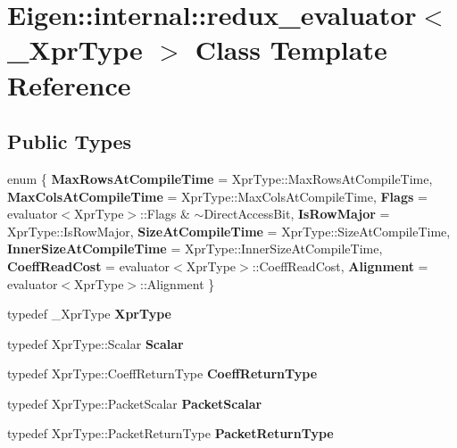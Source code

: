 \hypertarget{class_eigen_1_1internal_1_1redux__evaluator}{}\section{Eigen\+::internal\+::redux\+\_\+evaluator$<$ \+\_\+\+Xpr\+Type $>$ Class Template Reference}
\label{class_eigen_1_1internal_1_1redux__evaluator}
\subsection*{Public Types}
\begin{DoxyCompactItemize}
\item 
\mbox{\label{class_eigen_1_1internal_1_1redux__evaluator_aaf5162129fc671c417a2a0e9fa6ec01c}} 
enum \{ \newline
{\bfseries Max\+Rows\+At\+Compile\+Time} = Xpr\+Type\+::Max\+Rows\+At\+Compile\+Time, 
{\bfseries Max\+Cols\+At\+Compile\+Time} = Xpr\+Type\+::Max\+Cols\+At\+Compile\+Time, 
{\bfseries Flags} = evaluator$<$Xpr\+Type$>$\+::Flags \& $\sim$\+Direct\+Access\+Bit, 
{\bfseries Is\+Row\+Major} = Xpr\+Type\+::Is\+Row\+Major, 
\newline
{\bfseries Size\+At\+Compile\+Time} = Xpr\+Type\+::Size\+At\+Compile\+Time, 
{\bfseries Inner\+Size\+At\+Compile\+Time} = Xpr\+Type\+::Inner\+Size\+At\+Compile\+Time, 
{\bfseries Coeff\+Read\+Cost} = evaluator$<$Xpr\+Type$>$\+::Coeff\+Read\+Cost, 
{\bfseries Alignment} = evaluator$<$Xpr\+Type$>$\+::Alignment
 \}
\item 
\mbox{\label{class_eigen_1_1internal_1_1redux__evaluator_acc45bdab9b8f02fe19a183cd18dccaa6}} 
typedef \+\_\+\+Xpr\+Type {\bfseries Xpr\+Type}
\item 
\mbox{\label{class_eigen_1_1internal_1_1redux__evaluator_a1bf8a7092dd7275c5d575ad536c29a94}} 
typedef Xpr\+Type\+::\+Scalar {\bfseries Scalar}
\item 
\mbox{\label{class_eigen_1_1internal_1_1redux__evaluator_a23b1054b9d1aa504024ca69d9830b9fa}} 
typedef Xpr\+Type\+::\+Coeff\+Return\+Type {\bfseries Coeff\+Return\+Type}
\item 
\mbox{\label{class_eigen_1_1internal_1_1redux__evaluator_a40654b5cbdcd571f0587dcdadfddae19}} 
typedef Xpr\+Type\+::\+Packet\+Scalar {\bfseries Packet\+Scalar}
\item 
\mbox{\label{class_eigen_1_1internal_1_1redux__evaluator_a21a1cc38bfef69466788453f7f416662}} 
typedef Xpr\+Type\+::\+Packet\+Return\+Type {\bfseries Packet\+Return\+Type}
\end{DoxyCompactItemize}
